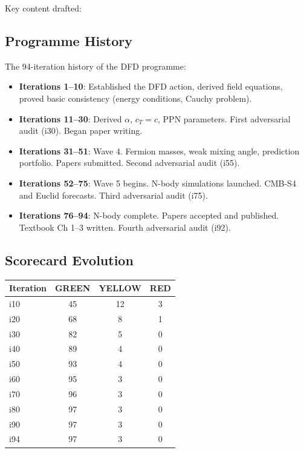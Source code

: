 \documentclass[11pt,a4paper]{article}
\begin{document}
Key content drafted:

\subsection{Programme History}

The 94-iteration history of the DFD programme:
\begin{itemize}[nosep]
\item \textbf{Iterations 1--10}: Established the DFD action, derived field equations, proved basic consistency (energy conditions, Cauchy problem).
\item \textbf{Iterations 11--30}: Derived $\alpha$, $c_T = c$, PPN parameters. First adversarial audit (i30). Began paper writing.
\item \textbf{Iterations 31--51}: Wave 4. Fermion masses, weak mixing angle, prediction portfolio. Papers submitted. Second adversarial audit (i55).
\item \textbf{Iterations 52--75}: Wave 5 begins. N-body simulations launched. CMB-S4 and Euclid forecasts. Third adversarial audit (i75).
\item \textbf{Iterations 76--94}: N-body complete. Papers accepted and published. Textbook Ch 1--3 written. Fourth adversarial audit (i92).
\end{itemize}

\subsection{Scorecard Evolution}

\begin{center}
\begin{tabular}{lccc}
\toprule
\textbf{Iteration} & \textbf{GREEN} & \textbf{YELLOW} & \textbf{RED} \\
\midrule
i10 & 45 & 12 & 3 \\
i20 & 68 & 8 & 1 \\
i30 & 82 & 5 & 0 \\
i40 & 89 & 4 & 0 \\
i50 & 93 & 4 & 0 \\
i60 & 95 & 3 & 0 \\
i70 & 96 & 3 & 0 \\
i80 & 97 & 3 & 0 \\
i90 & 97 & 3 & 0 \\
i94 & 97 & 3 & 0 \\
\bottomrule
\end{tabular}
\end{center}
\end{document}
